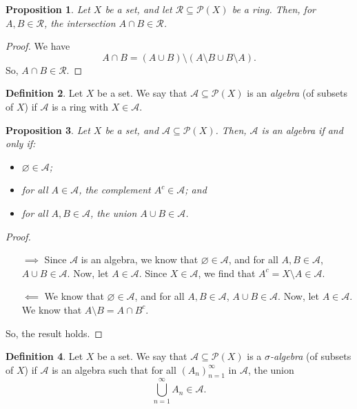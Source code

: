 \documentclass[a4paper, openany]{memoir}
\theoremstyle{definition}
\newtheorem{definition}{Definition}[section]
\theoremstyle{plain}
\newtheorem{proposition}[definition]{Proposition}
\begin{document}
    \begin{proposition}
        Let $X$ be a set, and let $\mathcal{R} \subseteq \mathcal{P}(X)$ be a ring. Then, for $A, B \in \mathcal{R}$, the intersection $A \cap B \in \mathcal{R}$.
    \end{proposition}
    \begin{proof}
        We have
        \[A \cap B = (A \cup B) \setminus (A \setminus B \cup B \setminus A).\]
        So, $A \cap B \in \mathcal{R}$.
    \end{proof}
    
    \begin{definition}
        Let $X$ be a set. We say that $\mathcal{A} \subseteq \mathcal{P}(X)$ is an \emph{algebra} (of subsets of $X$) if $\mathcal{A}$ is a ring with $X \in \mathcal{A}$.
    \end{definition}

    \begin{proposition}
        Let $X$ be a set, and $\mathcal{A} \subseteq \mathcal{P}(X)$. Then, $\mathcal{A}$ is an algebra if and only if:
        \begin{itemize}
            \item $\varnothing \in \mathcal{A}$;
            \item for all $A \in \mathcal{A}$, the complement $A^c \in \mathcal{A}$; and
            \item for all $A, B \in \mathcal{A}$, the union $A \cup B \in \mathcal{A}$.
        \end{itemize}
    \end{proposition}
    \begin{proof}
        \hspace{0pt}
        \begin{itemize}
            \item[$\implies$] Since $\mathcal{A}$ is an algebra, we know that $\varnothing \in \mathcal{A}$, and for all $A, B \in \mathcal{A}$, $A \cup B \in \mathcal{A}$. Now, let $A \in \mathcal{A}$. Since $X \in \mathcal{A}$, we find that $A^c = X \setminus A \in \mathcal{A}$.
            \item[$\impliedby$] We know that $\varnothing \in \mathcal{A}$, and for all $A, B \in \mathcal{A}$, $A \cup B \in \mathcal{A}$. Now, let $A \in \mathcal{A}$. We know that $A \setminus B = A \cap B^c$.
        \end{itemize}
        So, the result holds.
    \end{proof}

    \begin{definition}
        Let $X$ be a set. We say that $\mathcal{A} \subseteq \mathcal{P}(X)$ is a \emph{$\sigma$-algebra} (of subsets of $X$) if $\mathcal{A}$ is an algebra such that for all $(A_n)_{n=1}^\infty$ in $\mathcal{A}$, the union
        \[\bigcup_{n=1}^\infty A_n \in \mathcal{A}.\]
    \end{definition}
\end{document}

